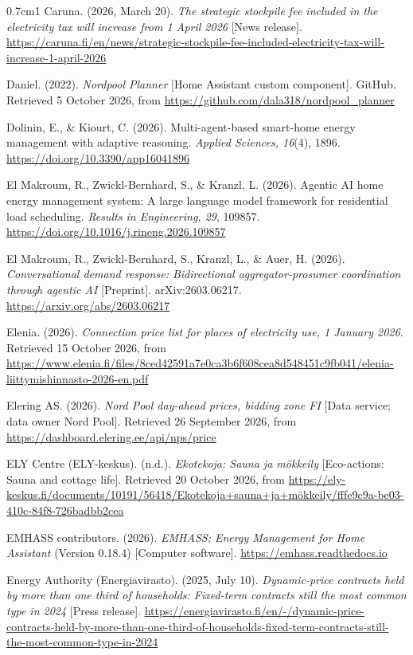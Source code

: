 \documentclass[12pt,a4paper]{report}
\begin{document}
\begin{hangparas}{0.7cm}{1}
Caruna. (2026, March 20). \textit{The strategic stockpile fee included in
the electricity tax will increase from 1 April 2026} [News release].
\url{https://caruna.fi/en/news/strategic-stockpile-fee-included-electricity-tax-will-increase-1-april-2026}

Daniel. (2022). \textit{Nordpool Planner} [Home Assistant custom
component]. GitHub. Retrieved 5 October 2026, from
\url{https://github.com/dala318/nordpool_planner}

Dolinin, E., \& Kiourt, C. (2026). Multi-agent-based smart-home energy
management with adaptive reasoning. \textit{Applied Sciences, 16}(4),
1896. \url{https://doi.org/10.3390/app16041896}

El Makroum, R., Zwickl-Bernhard, S., \& Kranzl, L. (2026). Agentic AI
home energy management system: A large language model framework for
residential load scheduling. \textit{Results in Engineering, 29},
109857. \url{https://doi.org/10.1016/j.rineng.2026.109857}

El Makroum, R., Zwickl-Bernhard, S., Kranzl, L., \& Auer, H. (2026).
\textit{Conversational demand response: Bidirectional
aggregator-prosumer coordination through agentic AI} [Preprint].
arXiv:2603.06217. \url{https://arxiv.org/abs/2603.06217}

Elenia. (2026). \textit{Connection price list for places of electricity
use, 1 January 2026}. Retrieved 15 October 2026, from
\url{https://www.elenia.fi/files/8ced42591a7e0ca3b6f608cea8d548451c9fb041/elenia-liittymishinnasto-2026-en.pdf}

Elering AS. (2026). \textit{Nord Pool day-ahead prices, bidding zone FI}
[Data service; data owner Nord Pool]. Retrieved 26 September 2026, from
\url{https://dashboard.elering.ee/api/nps/price}

ELY Centre (ELY-keskus). (n.d.). \textit{Ekotekoja: Sauna ja mökkeily}
[Eco-actions: Sauna and cottage life]. Retrieved 20 October 2026, from
\url{https://ely-keskus.fi/documents/10191/56418/Ekotekoja+sauna+ja+mökkeily/fffe9c9a-be03-410c-84f8-726badbb2cea}

EMHASS contributors. (2026). \textit{EMHASS: Energy Management for Home
Assistant} (Version 0.18.4) [Computer software].
\url{https://emhass.readthedocs.io}

Energy Authority (Energiavirasto). (2025, July 10).
\textit{Dynamic-price contracts held by more than one third of
households: Fixed-term contracts still the most common type in 2024}
[Press release].
\url{https://energiavirasto.fi/en/-/dynamic-price-contracts-held-by-more-than-one-third-of-households-fixed-term-contracts-still-the-most-common-type-in-2024}


\end{hangparas}
\end{document}
